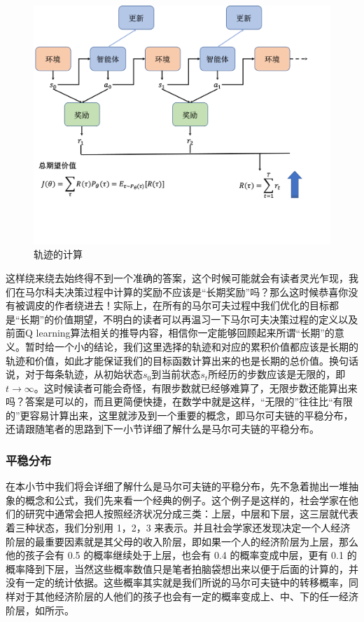 \begin{figure}[hbt]
    \centering
    \includegraphics[width=0.5\linewidth]{ch6/figs/expected_reward.png}
    \caption{轨迹的计算}
    \label{fig:traj_compute}
\end{figure}

这样绕来绕去始终得不到一个准确的答案，这个时候可能就会有读者灵光乍现，我们在马尔科夫决策过程中计算的奖励不应该是“长期奖励”吗？那么这时候恭喜你没有被调皮的作者绕进去！实际上，在所有的马尔可夫过程中我们优化的目标都是“长期”的价值期望，不明白的读者可以再温习一下马尔可夫决策过程的定义以及前面Q learning算法相关的推导内容，相信你一定能够回顾起来所谓“长期”的意义。暂时给一个小的结论，我们这里选择的轨迹和对应的累积价值都应该是长期的轨迹和价值，如此才能保证我们的目标函数计算出来的也是长期的总价值。换句话说，对于每条轨迹，从初始状态$s_0$到当前状态$s_t$所经历的步数应该是无限的，即$t \rightarrow \infty$。这时候读者可能会奇怪，有限步数就已经够难算了，无限步数还能算出来吗？答案是可以的，而且更简便快捷，在数学中就是这样，“无限的”往往比“有限的”更容易计算出来，这里就涉及到一个重要的概念，即马尔可夫链的平稳分布，还请跟随笔者的思路到下一小节详细了解什么是马尔可夫链的平稳分布。

\subsubsection{平稳分布}

在本小节中我们将会详细了解什么是马尔可夫链的平稳分布，先不急着抛出一堆抽象的概念和公式，我们先来看一个经典的例子。这个例子是这样的，社会学家在他们的研究中通常会把人按照经济状况分成三类：上层，中层和下层，这三层就代表着三种状态，我们分别用 1，2，3 来表示。并且社会学家还发现决定一个人经济阶层的最重要因素就是其父母的收入阶层，即如果一个人的经济阶层为上层，那么他的孩子会有 0.5 的概率继续处于上层，也会有 0.4 的概率变成中层，更有 0.1 的概率降到下层，当然这些概率数值只是笔者拍脑袋想出来以便于后面的计算的，并没有一定的统计依据。这些概率其实就是我们所说的马尔可夫链中的转移概率，同样对于其他经济阶层的人他们的孩子也会有一定的概率变成上、中、下的任一经济阶层，如所示。

